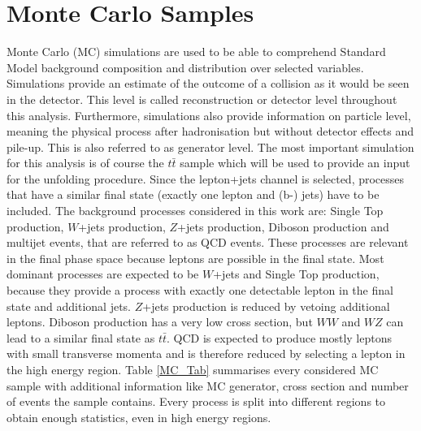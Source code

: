 	\section{Monte Carlo Samples}
	Monte Carlo (MC) simulations are used to be able to comprehend Standard Model background composition and distribution over selected variables. Simulations provide an estimate of the outcome of a collision as it would be seen in the detector. This level is called reconstruction or detector level throughout this analysis. Furthermore, simulations also provide information on particle level, meaning the physical process after hadronisation but without detector effects and pile-up. This is also referred to as generator level. The most important simulation for this analysis is of course the $t\bar{t}$ sample which will be used to provide an input for the unfolding procedure. Since the lepton+jets channel is selected, processes that have a similar final state (exactly one lepton and (b-) jets) have to be included. The background processes considered in this work are: Single Top production, $W$+jets production, $Z$+jets production, Diboson production and multijet events, that are referred to as QCD events. These processes are relevant in the final phase space because leptons are possible in the final state. Most dominant processes are expected to be $W$+jets and Single Top production, because they provide a process with exactly one detectable lepton in the final state and additional jets. $Z$+jets production is reduced by vetoing additional leptons. Diboson production has a very low cross section, but $WW$ and $WZ$ can lead to a similar final state as $t\bar{t}$. QCD is expected to produce mostly leptons with small transverse momenta and is therefore reduced by selecting a lepton in the high energy region. Table \ref{MC_Tab} summarises every considered MC sample with additional information like MC generator, cross section and number of events the sample contains. Every process is split into different regions to obtain enough statistics, even in high energy regions.	
